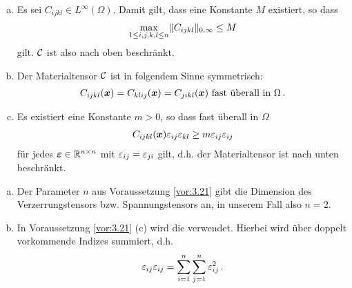 \begin{vor}\label{vor:3.21}
\begin{enumerate}[(a)]
\item Es sei $C_{ijkl} \in L^\infty(\Omega)$. Damit gilt, dass eine Konstante $M$ existiert, so dass
\begin{align}\label{eq:3.46}
	\max_{1\le i,j,k,l \le n} \lVert C_{ijkl}\rVert_{0,\infty} \le M 
\end{align}
gilt. $\mathcal C$ ist also nach oben beschränkt.
\item Der Materialtensor $\mathcal C$ ist in folgendem Sinne symmetrisch:
\begin{align}\label{eq:3.47}
	C_{ijkl} (\boldsymbol x) = C_{klij} (\boldsymbol x) = C_{jikl}(\boldsymbol x) \text{ fast überall in } \Omega \, .
\end{align}
\item Es existiert eine Konstante $m> 0$, so dass fast überall in $\Omega$
\begin{align}\label{eq:3.48}
	C_{ijkl}(\boldsymbol x) \varepsilon_{ij}\varepsilon_{kl} \ge m \varepsilon_{ij}\varepsilon_{ij}
\end{align}
für jedes $\boldsymbol {\varepsilon} \in \mathbb{R}^{n\times n}$ mit $\varepsilon_{ij} = \varepsilon_{ji}$ gilt, d.h. der Materialtensor ist nach unten beschränkt.
\end{enumerate}
\end{vor}


\begin{notation}
\begin{enumerate}[(a)]
\item Der Parameter $n$ aus Voraussetzung \ref{vor:3.21} gibt die Dimension des Verzerrungstensors bzw. Spannungstensors an, in unserem Fall also $n = 2$.
\item In Voraussetzung \ref{vor:3.21} (c) wird die \textit{} verwendet. Hierbei wird über doppelt vorkommende Indizes summiert, d.h.
\[
	\varepsilon_{ij}\varepsilon_{ij} = \sum_{i=1}^n\sum_{j=1}^n \varepsilon_{ij}^2 \, .
\]
\end{enumerate}
\end{notation}


